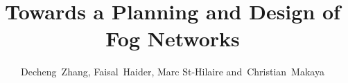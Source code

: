 \documentclass[10pt,journal,compsoc]{IEEEtran}
\begin{document}
%
\title{Towards a Planning and Design of Fog Networks}
%
%
%
%

\author{Decheng~Zhang, %
        Faisal~Haider, %
        Marc St-Hilaire %
        and~Christian~Makaya%

}
\end{document}
